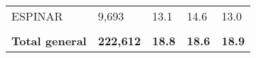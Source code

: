 \begin{tabular}{lllll}
	\cellcolor[HTML]{FF5050}ESPINAR                                & 9,693                                                                 & 13.1                                                                             & 14.6                                                                        & 13.0                                                                                \\
	&                                                                       &                                                                                  &                                                                             &                                                                                     \\
	\rowcolor[HTML]{DDEBF7} 
	\textbf{Total   general}                                       & \textbf{222,612}                                                      & \textbf{18.8}                                                                    & \textbf{18.6}                                                               & \textbf{18.9}                                                                      
\end{tabular}